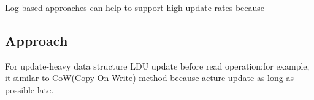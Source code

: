 Log-based approaches can help to support high update rates because


\subsection{Approach}




For update-heavy data structure LDU update before read operation;for example, it
similar to CoW(Copy On Write) method because acture update as long as possible
late.







